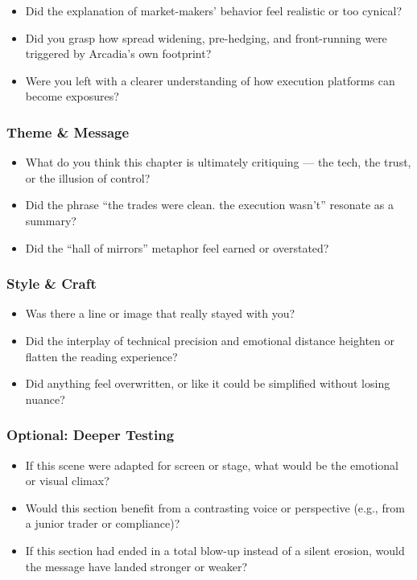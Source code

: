 \begin{itemize}
  \item Did the explanation of market-makers’ behavior feel realistic or too cynical?
  \item Did you grasp how spread widening, pre-hedging, and front-running were triggered by Arcadia’s own footprint?
  \item Were you left with a clearer understanding of how execution platforms can become exposures?
\end{itemize}

\subsubsection{Theme \& Message}

\begin{itemize}
  \item What do you think this chapter is ultimately critiquing — the tech, the trust, or the illusion of control?
  \item Did the phrase ``the trades were clean. the execution wasn’t'' resonate as a summary?
  \item Did the “hall of mirrors” metaphor feel earned or overstated?
\end{itemize}

\subsubsection{Style \& Craft}

\begin{itemize}
  \item Was there a line or image that really stayed with you?
  \item Did the interplay of technical precision and emotional distance heighten or flatten the reading experience?
  \item Did anything feel overwritten, or like it could be simplified without losing nuance?
\end{itemize}

\subsubsection{Optional: Deeper Testing}

\begin{itemize}
  \item If this scene were adapted for screen or stage, what would be the emotional or visual climax?
  \item Would this section benefit from a contrasting voice or perspective (e.g., from a junior trader or compliance)?
  \item If this section had ended in a total blow-up instead of a silent erosion, would the message have landed stronger or weaker?
\end{itemize}





